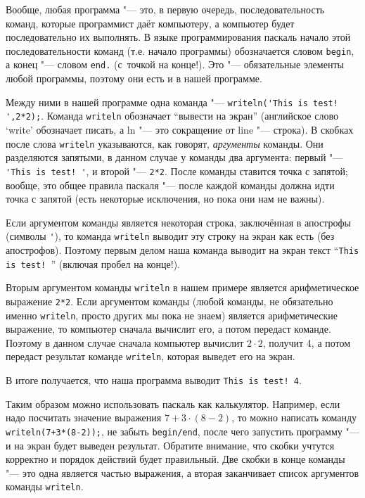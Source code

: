 Вообще, любая программа "--- это, в первую очередь, последовательность команд, которые программист 
даёт компьютеру, а компьютер будет последовательно их выполнять. В языке программирования паскаль 
начало этой последовательности команд (т.е. начало программы) обозначается словом \verb`begin`, а 
конец "--- словом \verb`end.` (с~точкой на конце!). Это "--- обязательные элементы любой программы, поэтому они есть и в 
нашей программе. 

Между ними в нашей программе одна команда "--- \verb`writeln('This is test! ',2*2);`. Команда 
\verb`writeln` обозначает ``вывести на экран'' (английское слово `write' обозначает писать, а ln 
"--- это сокращение от line "--- строка). В скобках после слова \verb`writeln` указываются, как 
говорят, \textit{аргументы} команды. Они разделяются запятыми, в данном случае у команды два 
аргумента: первый "--- \verb`'This is test! '`, и второй "--- \verb`2*2`. После команды ставится 
точка с запятой; вообще, это общее правила паскаля "--- после каждой команды должна идти точка с 
запятой (есть некоторые исключения, но пока они нам не важны).

Если аргументом команды является некоторая строка, заключённая в апострофы (символы \verb`'`), то 
команда \verb`writeln` выводит эту строку на экран как есть (без апострофов). Поэтому первым делом наша команда 
выводит на экран текст ``\verb`This is test! `'' (включая пробел на конце!).

Вторым аргументом команды \verb`writeln` в нашем примере является арифметическое выражение 
\verb`2*2`. Если аргументом команды (любой команды, не обязательно именно \verb`writeln`, 
просто других мы 
пока не знаем) является арифметические выражение, то компьютер сначала вычислит его, а потом 
передаст команде. Поэтому в данном случае сначала компьютер вычислит $2\cdot 2$, получит 4, а потом 
передаст результат команде \verb`writeln`, которая выведет его на экран. 

В итоге получается, что наша программа выводит \verb`This is test! 4`.


Таким образом можно использовать паскаль как калькулятор. Например, если надо посчитать значение 
выражения $7+3\cdot(8-2)$, то можно написать команду \verb`writeln(7+3*(8-2));`, не забыть 
\verb`begin/end`, после чего запустить программу "--- и на экран будет выведен результат. Обратите 
внимание, что скобки учтутся корректно и порядок действий будет правильный. Две скобки в конце команды "--- это одна 
является частью выражения, а вторая заканчивает список аргументов команды \verb`writeln`.

